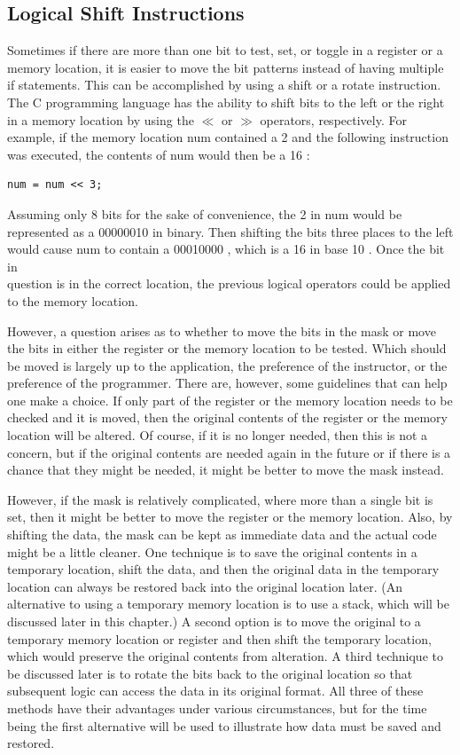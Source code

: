 \documentclass[10pt]{article}
\begin{document}
\subsection*{Logical Shift Instructions}
Sometimes if there are more than one bit to test, set, or toggle in a register or a memory location, it is easier to move the bit patterns instead of having multiple if statements. This can be accomplished by using a shift or a rotate instruction. The C programming language has the ability to shift bits to the left or the right in a memory location by using the $\ll$ or $\gg$ operators, respectively. For example, if the memory location num contained a 2 and the following instruction was executed, the contents of num would then be a 16 :

\begin{verbatim}
num = num << 3;
\end{verbatim}

Assuming only 8 bits for the sake of convenience, the 2 in num would be represented as a 00000010 in binary. Then shifting the bits three places to the left would cause num to contain a 00010000 , which is a 16 in base 10 . Once the bit in\\
question is in the correct location, the previous logical operators could be applied to the memory location.

However, a question arises as to whether to move the bits in the mask or move the bits in either the register or the memory location to be tested. Which should be moved is largely up to the application, the preference of the instructor, or the preference of the programmer. There are, however, some guidelines that can help one make a choice. If only part of the register or the memory location needs to be checked and it is moved, then the original contents of the register or the memory location will be altered. Of course, if it is no longer needed, then this is not a concern, but if the original contents are needed again in the future or if there is a chance that they might be needed, it might be better to move the mask instead.

However, if the mask is relatively complicated, where more than a single bit is set, then it might be better to move the register or the memory location. Also, by shifting the data, the mask can be kept as immediate data and the actual code might be a little cleaner. One technique is to save the original contents in a temporary location, shift the data, and then the original data in the temporary location can always be restored back into the original location later. (An alternative to using a temporary memory location is to use a stack, which will be discussed later in this chapter.) A second option is to move the original to a temporary memory location or register and then shift the temporary location, which would preserve the original contents from alteration. A third technique to be discussed later is to rotate the bits back to the original location so that subsequent logic can access the data in its original format. All three of these methods have their advantages under various circumstances, but for the time being the first alternative will be used to illustrate how data must be saved and restored.
\end{document}
